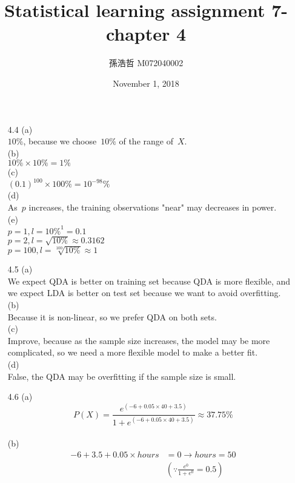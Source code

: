 \documentclass[12pt]{article}
\title{Statistical learning assignment 7- chapter 4}
\author{孫浩哲 \hspace{0.7cm} M072040002}
\date{November 1, 2018}
\begin{document}
\maketitle
\begin{itemize}
\item[4.4]
(a)\\
$10\%$, because we choose\ $10\%$ of the range of\ $X$.\\[2ex]
(b)\\
$10\%\times10\%=1\%$\\[2ex]
(c)\\
$(0.1)^{100}\times100\%=10^{-98}\%$\\[2ex]
(d)\\
As\ $p$ increases, the training observations "near" may decreases in power.\\[2ex]
(e)\\  
$p=1, l=10\%^1=0.1$\\[2ex]
$p=2, l=\sqrt{10\%}\approx0.3162$\\[2ex]
$p=100, l=\sqrt[100]{10\%}\approx1$
\item[4.5]
(a)\\
We expect QDA is better on training set because QDA is more flexible, and we expect LDA is better on test set because we want to avoid overfitting.\\[2ex]
(b)\\
Because it is non-linear, so we prefer QDA on both sets.\\[2ex]
(c)\\
Improve, because as the sample size increases, the model may be more complicated, so we need a more flexible model to make a better fit.\\[2ex]
(d)\\
False, the QDA may be overfitting if the sample size is small.
\item[4.6]
(a)\\
$$
P(X)=\frac{e^{(-6+0.05\times40+3.5)}}{1+e^{(-6+0.05\times40+3.5)}}\approx37.75\%
$$\\[3ex]
(b)\\
\begin{align*}
-6+3.5+0.05\times hours
&=0\rightarrow hours=50\\
&(\because\frac{e^0}{1+e^0}=0.5)
\end{align*}
\end{itemize}
\end{document}
